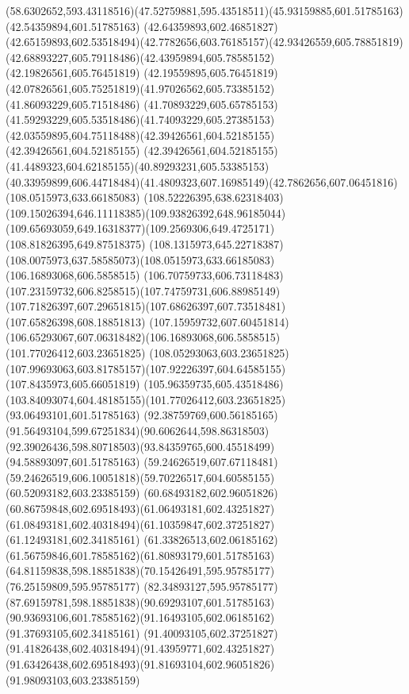 {{\curveto(58.6302652,593.43118516)(47.52759881,595.43518511)(45.93159885,601.51785163)
\lineto(42.54359894,601.51785163)
\lineto(42.64359893,602.46851827)
\curveto(42.65159893,602.53518494)(42.7782656,603.76185157)(42.93426559,605.78851819)
\curveto(42.68893227,605.79118486)(42.43959894,605.78585152)(42.19826561,605.76451819)
\lineto(42.19559895,605.76451819)
\curveto(42.07826561,605.75251819)(41.97026562,605.73385152)(41.86093229,605.71518486)
\curveto(41.70893229,605.65785153)(41.59293229,605.53518486)(41.74093229,605.27385153)
\curveto(42.03559895,604.75118488)(42.39426561,604.52185155)(42.39426561,604.52185155)
\curveto(42.39426561,604.52185155)(41.4489323,604.62185155)(40.89293231,605.53385153)
\curveto(40.33959899,606.44718484)(41.4809323,607.16985149)(42.7862656,607.06451816)
\moveto(108.0515973,633.66185083)
\curveto(108.52226395,638.62318403)(109.15026394,646.11118385)(109.93826392,648.96185044)
\curveto(109.65693059,649.16318377)(109.2569306,649.4725171)(108.81826395,649.87518375)
\curveto(108.1315973,645.22718387)(108.0075973,637.58585073)(108.0515973,633.66185083)
\moveto(106.16893068,606.5858515)
\curveto(106.70759733,606.73118483)(107.23159732,606.8258515)(107.74759731,606.88985149)
\curveto(107.71826397,607.29651815)(107.68626397,607.73518481)(107.65826398,608.18851813)
\curveto(107.15959732,607.60451814)(106.65293067,607.06318482)(106.16893068,606.5858515)
\moveto(101.77026412,603.23651825)
\lineto(108.05293063,603.23651825)
\curveto(107.99693063,603.81785157)(107.92226397,604.64585155)(107.8435973,605.66051819)
\curveto(105.96359735,605.43518486)(103.84093074,604.48185155)(101.77026412,603.23651825)
\moveto(93.06493101,601.51785163)
\curveto(92.38759769,600.56185165)(91.56493104,599.67251834)(90.6062644,598.86318503)
\curveto(92.39026436,598.80718503)(93.84359765,600.45518499)(94.58893097,601.51785163)
\closepath
\moveto(59.24626519,607.67118481)
\curveto(59.24626519,606.10051818)(59.70226517,604.60585155)(60.52093182,603.23385159)
\curveto(60.68493182,602.96051826)(60.86759848,602.69518493)(61.06493181,602.43251827)
\curveto(61.08493181,602.40318494)(61.10359847,602.37251827)(61.12493181,602.34185161)
\curveto(61.33826513,602.06185162)(61.56759846,601.78585162)(61.80893179,601.51785163)
\curveto(64.81159838,598.18851838)(70.15426491,595.95785177)(76.25159809,595.95785177)
\curveto(82.34893127,595.95785177)(87.69159781,598.18851838)(90.69293107,601.51785163)
\curveto(90.93693106,601.78585162)(91.16493105,602.06185162)(91.37693105,602.34185161)
\curveto(91.40093105,602.37251827)(91.41826438,602.40318494)(91.43959771,602.43251827)
\curveto(91.63426438,602.69518493)(91.81693104,602.96051826)(91.98093103,603.23385159)
}}
